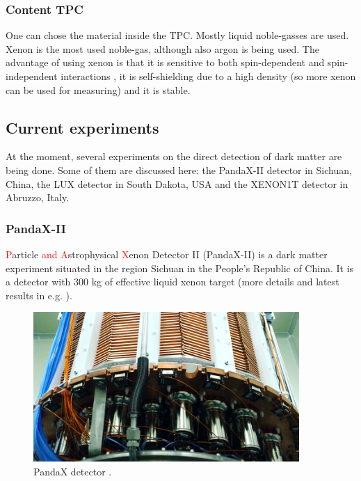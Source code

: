 \documentclass{article}
\begin{document}
\subsubsection{Content TPC}
One can chose the material inside the TPC. Mostly liquid noble-gasses are used. Xenon is the most used noble-gas, although also argon is being used. The advantage of using xenon is that it is sensitive to both spin-dependent and spin-independent interactions \cite{Aprile:2013doa}, it is self-shielding due to a high density (so more xenon can be used for measuring) \cite{Undagoitia:2015gya} and it is stable.




\subsection{Current experiments}
\label{sec:current_exp}
At the moment, several experiments on the direct detection of dark matter are being done. Some of them are discussed here: the PandaX-II detector in Sichuan, China, the LUX detector in South Dakota, USA and the XENON1T detector in Abruzzo, Italy.

\subsubsection{PandaX-II}
\label{sec:PandaX}\textcolor{red}{P}article \textcolor{red}{and A}strophysical \textcolor{red}{X}enon Detector II (PandaX-II) is a dark matter experiment situated in the region Sichuan in the People's Republic of China. It is a detector with 300 kg of effective liquid xenon target \cite{Liu2015} (more details and latest results in e.g. \cite{Cui:2017nnn}).\\

\begin{figure}[h]
    \centering
    \includegraphics[width=0.9\textwidth]{pandax.jpg}
    \caption{PandaX detector \cite{SJTU}.}
    \label{fig:PandaX}
\end{figure}
\end{document}
